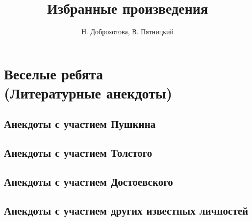 \documentclass[14pt, a4paper]{extarticle}
\begin{document}
\author{Н. Доброхотова, В. Пятницкий}
\title{Избранные произведения}
\date{}

\maketitle

\section*{Веселые ребята \\ (Литературные анекдоты)}

\subsection*{Анекдоты с участием Пушкина}


\subsection*{Анекдоты с участием Толстого}


\subsection*{Анекдоты с участием Достоевского}


\subsection*{Анекдоты с участием других известных личностей}

\end{document}
